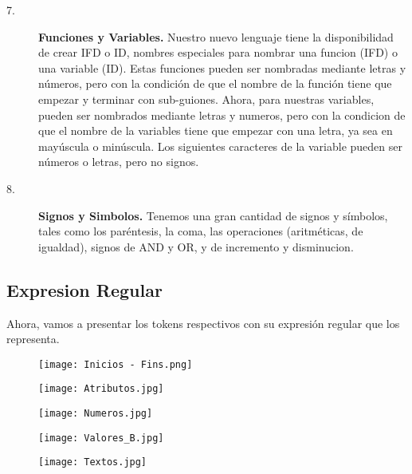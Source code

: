 \documentclass{article}
\begin{document}
\begin{description}
    \item[7. ] \textbf{Funciones y Variables.} Nuestro nuevo lenguaje tiene la disponibilidad de crear IFD o ID, nombres especiales para nombrar una funcion (IFD) o una variable (ID). Estas funciones pueden ser nombradas mediante letras y números, pero con la condición de que el nombre de la función tiene que empezar y terminar con sub-guiones. Ahora, para nuestras variables, pueden ser nombrados mediante letras y numeros, pero con la condicion de que el nombre de la variables tiene que empezar con una letra, ya sea en mayúscula o minúscula. Los siguientes caracteres de la variable pueden ser números o letras, pero no signos.
    
    \item[8. ] \textbf{Signos y Simbolos.} Tenemos una gran cantidad de signos y símbolos, tales como los paréntesis, la coma, las operaciones (aritméticas, de igualdad), signos de AND y OR, y de incremento y disminucion.
\end{description}

\subsection{Expresion Regular}
Ahora, vamos a presentar los tokens respectivos con su expresión regular que los representa.


    \begin{figure}[htbp]
        \centering
        \texttt{[image: Inicios - Fins.png]}
        \label{fig:ejemplo}
    \end{figure}
    
    \begin{figure}[htbp]
        \centering
        \texttt{[image: Atributos.jpg]}
        \label{fig:ejemplo}
    \end{figure}
    
    \begin{figure}[htbp]
        \centering
        \texttt{[image: Numeros.jpg]}
        \label{fig:ejemplo}
    \end{figure}

    \begin{figure}[htbp]
        \centering
        \texttt{[image: Valores\_B.jpg]}
        \label{fig:ejemplo}
    \end{figure}

    \begin{figure}[htbp]
        \centering
        \texttt{[image: Textos.jpg]}
        \label{fig:ejemplo}
    \end{figure}
\end{document}
